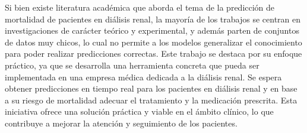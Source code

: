 Si bien existe literatura académica que aborda el tema de la predicción de mortalidad de pacientes en diálisis renal, la mayoría de los trabajos se centran en investigaciones de carácter teórico y experimental, y además parten de conjuntos de datos muy chicos, lo cual no permite a los modelos generalizar el conocimiento para poder realizar predicciones correctas. Este trabajo se destaca por su enfoque práctico, ya que se desarrolla una herramienta concreta que pueda ser implementada en una empresa médica dedicada a la diálisis renal. Se espera obtener predicciones en tiempo real para los pacientes en diálisis renal y en base a su riesgo de mortalidad adecuar el tratamiento y la medicación prescrita. Esta iniciativa ofrece una solución práctica y viable en el ámbito clínico, lo que contribuye a mejorar la atención y seguimiento de los pacientes.